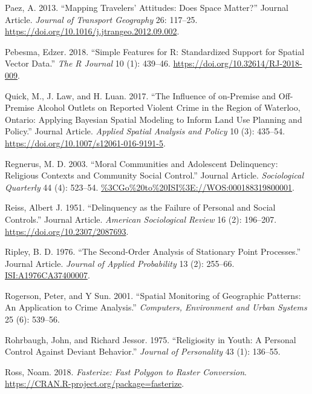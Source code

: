 \documentclass[smallextended]{svjour3}       %
\begin{document}
\leavevmode\hypertarget{ref-Paez2013mapping}{}%
Paez, A. 2013. ``Mapping Travelers' Attitudes: Does Space Matter?''
Journal Article. \emph{Journal of Transport Geography} 26: 117--25.
\url{https://doi.org/10.1016/j.jtrangeo.2012.09.002}.

\leavevmode\hypertarget{ref-Pebesma2018simple}{}%
Pebesma, Edzer. 2018. ``Simple Features for R: Standardized Support for
Spatial Vector Data.'' \emph{The R Journal} 10 (1): 439--46.
\url{https://doi.org/10.32614/RJ-2018-009}.

\leavevmode\hypertarget{ref-Quick2017influence}{}%
Quick, M., J. Law, and H. Luan. 2017. ``The Influence of on-Premise and
Off-Premise Alcohol Outlets on Reported Violent Crime in the Region of
Waterloo, Ontario: Applying Bayesian Spatial Modeling to Inform Land Use
Planning and Policy.'' Journal Article. \emph{Applied Spatial Analysis
and Policy} 10 (3): 435--54.
\url{https://doi.org/10.1007/s12061-016-9191-5}.

\leavevmode\hypertarget{ref-Regnerus2003moral}{}%
Regnerus, M. D. 2003. ``Moral Communities and Adolescent Delinquency:
Religious Contexts and Community Social Control.'' Journal Article.
\emph{Sociological Quarterly} 44 (4): 523--54.
\url{\%3CGo\%20to\%20ISI\%3E://WOS:000188319800001}.

\leavevmode\hypertarget{ref-Reiss1951delinquency}{}%
Reiss, Albert J. 1951. ``Delinquency as the Failure of Personal and
Social Controls.'' Journal Article. \emph{American Sociological Review}
16 (2): 196--207. \url{https://doi.org/10.2307/2087693}.

\leavevmode\hypertarget{ref-Ripley1976second}{}%
Ripley, B. D. 1976. ``The Second-Order Analysis of Stationary Point
Processes.'' Journal Article. \emph{Journal of Applied Probability} 13
(2): 255--66. \url{ISI:A1976CA37400007}.

\leavevmode\hypertarget{ref-Rogerson2001spatial}{}%
Rogerson, Peter, and Y Sun. 2001. ``Spatial Monitoring of Geographic
Patterns: An Application to Crime Analysis.'' \emph{Computers,
Environment and Urban Systems} 25 (6): 539--56.

\leavevmode\hypertarget{ref-Rohrbaugh1975religiosity}{}%
Rohrbaugh, John, and Richard Jessor. 1975. ``Religiosity in Youth: A
Personal Control Against Deviant Behavior.'' \emph{Journal of
Personality} 43 (1): 136--55.

\leavevmode\hypertarget{ref-Ross2018fasterize}{}%
Ross, Noam. 2018. \emph{Fasterize: Fast Polygon to Raster Conversion}.
\url{https://CRAN.R-project.org/package=fasterize}.
\end{document}
